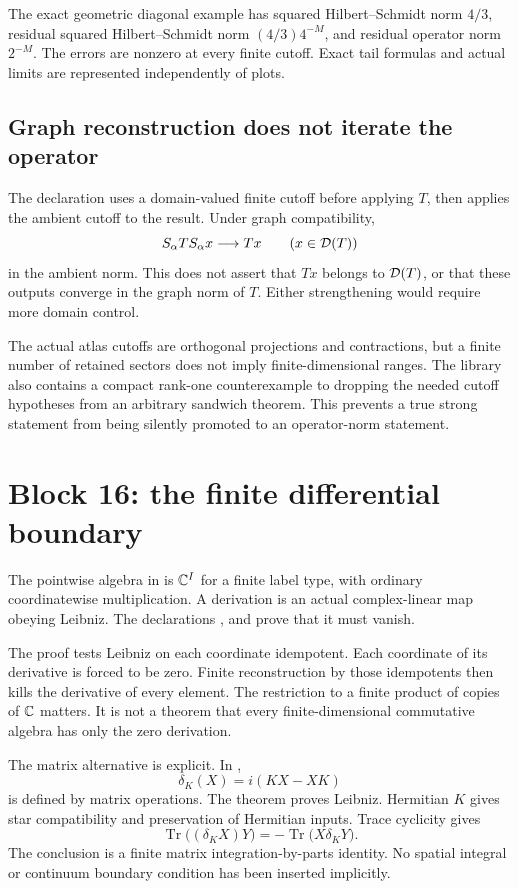 The exact geometric diagonal example has squared Hilbert--Schmidt norm \(4/3\), residual squared Hilbert--Schmidt norm \((4/3)4^{-M}\), and residual operator norm \(2^{-M}\). The errors are nonzero at every finite cutoff. Exact tail formulas and actual limits are represented independently of plots.

\subsection{Graph reconstruction does not iterate the operator}

The declaration  uses a domain-valued finite cutoff before applying \(T\), then applies the ambient cutoff to the result. Under graph compatibility,
\[
 S_\alpha T S_\alpha x\longrightarrow Tx
 \qquad (x\in\mathcal D(T))
\]
in the ambient norm. This does not assert that \(Tx\) belongs to \(\mathcal D(T)\), or that these outputs converge in the graph norm of \(T\). Either strengthening would require more domain control.

The actual atlas cutoffs are orthogonal projections and contractions, but a finite number of retained sectors does not imply finite-dimensional ranges. The library also contains a compact rank-one counterexample to dropping the needed cutoff hypotheses from an arbitrary sandwich theorem. This prevents a true strong statement from being silently promoted to an operator-norm statement.

\section{Block 16: the finite differential boundary}

The pointwise algebra in  is \(\mathbb C^I\) for a finite label type, with ordinary coordinatewise multiplication. A derivation is an actual complex-linear map obeying Leibniz. The declarations ,  and  prove that it must vanish.

The proof tests Leibniz on each coordinate idempotent. Each coordinate of its derivative is forced to be zero. Finite reconstruction by those idempotents then kills the derivative of every element. The restriction to a finite product of copies of \(\mathbb C\) matters. It is not a theorem that every finite-dimensional commutative algebra has only the zero derivation.

The matrix alternative is explicit. In ,
\[
 \delta_K(X)=i(KX-XK)
\]
is defined by matrix operations. The theorem  proves Leibniz. Hermitian \(K\) gives star compatibility and preservation of Hermitian inputs. Trace cyclicity gives
\[
 \operatorname{Tr}\bigl((\delta_KX)Y\bigr)
 =-\operatorname{Tr}\bigl(X\delta_KY\bigr).
\]
The conclusion is a finite matrix integration-by-parts identity. No spatial integral or continuum boundary condition has been inserted implicitly.

